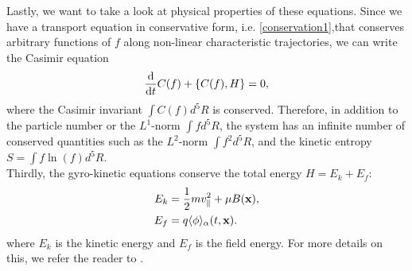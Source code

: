 Lastly, we want to take a look at physical properties of these equations. Since we have a transport equation in conservative form, i.e. \eqref{conservation1},that conserves arbitrary functions of $f$  along non-linear characteristic trajectories, we can write the Casimir equation
\begin{equation}
\frac{\text{d}}{\text{d} t} C(f) + \left\{ C(f), H \right\} =0,
\end{equation}
where the Casimir invariant $\int C( f ) d^5R$ is conserved. Therefore, in addition to the particle number or the $L^1$-norm $\int f d^5R$, the system has an infinite number of conserved quantities such as the $L^2$-norm $\int f^2 d^5R$, and the kinetic entropy $S=\int f \ln(f) d^5R$.\\
Thirdly, the gyro-kinetic equations conserve the total energy $H = E_k + E_f$:
\begin{subequations}
	\begin{align}
		E_k &= \frac{1}{2} m v_\parallel^2 + \mu B(\mathbf{x}),\\
		E_f &= q \langle \phi \rangle_\alpha (t,\mathbf{x}).
	\end{align}
\end{subequations}
where $E_k$ is the kinetic energy and $E_f$ is the field energy. For more details on this, we refer the reader to \cite{idomura2008conservative}.